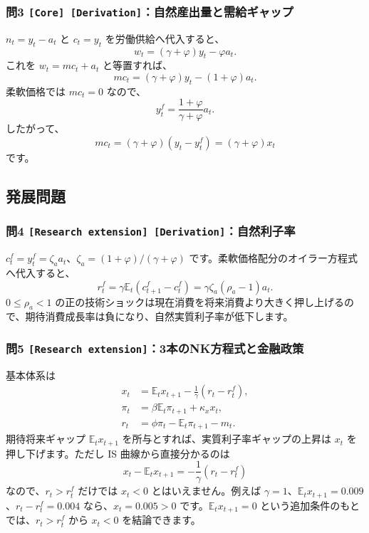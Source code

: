 \documentclass[
  japanese,
  lualatex,
  ja=standard,
  11pt,
  a4paper]{ltjsarticle}
\begin{document}
\subsubsection{\texorpdfstring{問3
\texttt{{[}Core{]}\ {[}Derivation{]}}：自然産出量と需給ギャップ}{問3 {[}Core{]} {[}Derivation{]}：自然産出量と需給ギャップ}}\label{ux554f3-core-derivationux81eaux7136ux7523ux51faux91cfux3068ux9700ux7d66ux30aeux30e3ux30c3ux30d7}

\(n_t=y_t-a_t\) と \(c_t=y_t\) を労働供給へ代入すると、 \[
w_t=(\gamma+\varphi)y_t-\varphi a_t.
\] これを \(w_t=mc_t+a_t\) と等置すれば、 \[
mc_t=(\gamma+\varphi)y_t-(1+\varphi)a_t.
\] 柔軟価格では \(mc_t=0\) なので、 \[
y_t^f=\frac{1+\varphi}{\gamma+\varphi}a_t.
\] したがって、 \[
mc_t=(\gamma+\varphi)(y_t-y_t^f)
=(\gamma+\varphi)x_t
\] です。

\subsection{発展問題}\label{ux767aux5c55ux554fux984c-6}

\subsubsection{\texorpdfstring{問4
\texttt{{[}Research\ extension{]}\ {[}Derivation{]}}：自然利子率}{問4 {[}Research extension{]} {[}Derivation{]}：自然利子率}}\label{ux554f4-research-extension-derivationux81eaux7136ux5229ux5b50ux7387}

\(c_t^f=y_t^f=\zeta_a a_t\)、\(\zeta_a=(1+\varphi)/(\gamma+\varphi)\)
です。柔軟価格配分のオイラー方程式へ代入すると、 \[
r_t^f
=\gamma\mathbb E_t(c_{t+1}^f-c_t^f)
=\gamma\zeta_a(\rho_a-1)a_t.
\] \(0\leq\rho_a<1\)
の正の技術ショックは現在消費を将来消費より大きく押し上げるので、期待消費成長率は負になり、自然実質利子率が低下します。

\subsubsection{\texorpdfstring{問5
\texttt{{[}Research\ extension{]}}：3本のNK方程式と金融政策}{問5 {[}Research extension{]}：3本のNK方程式と金融政策}}\label{ux554f5-research-extension3ux672cux306enkux65b9ux7a0bux5f0fux3068ux91d1ux878dux653fux7b56}

基本体系は \[
\begin{aligned}
x_t&=\mathbb E_tx_{t+1}-\frac1\gamma(r_t-r_t^f),\\
\pi_t&=\beta\mathbb E_t\pi_{t+1}+\kappa_xx_t,\\
r_t&=\phi\pi_t-\mathbb E_t\pi_{t+1}-m_t.
\end{aligned}
\] 期待将来ギャップ \(\mathbb E_tx_{t+1}\)
を所与とすれば、実質利子率ギャップの上昇は \(x_t\)
を押し下げます。ただし IS 曲線から直接分かるのは \[
x_t-\mathbb E_tx_{t+1}=-\frac1\gamma(r_t-r_t^f)
\] なので、\(r_t>r_t^f\) だけでは \(x_t<0\) とはいえません。例えば
\(\gamma=1\)、\(\mathbb E_tx_{t+1}=0.009\)、\(r_t-r_t^f=0.004\)
なら、\(x_t=0.005>0\) です。\(\mathbb E_tx_{t+1}=0\)
という追加条件のもとでは、\(r_t>r_t^f\) から \(x_t<0\) を結論できます。
\end{document}
